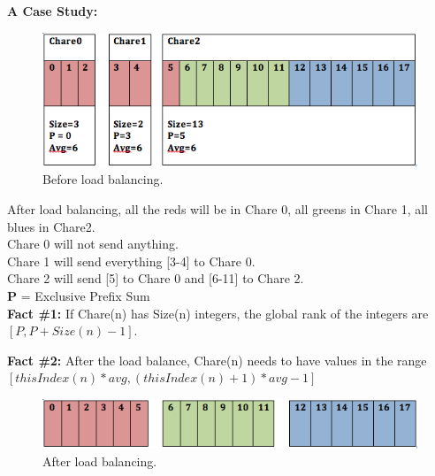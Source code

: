 \documentclass{article}
\begin{document}

\textbf{A Case Study:} 

\begin{figure}[h]
\centering
\includegraphics[width=\textwidth]{before_balance.png}
\caption{Before load balancing.}
\label{prefix}
\end{figure}

After load balancing, all the reds will be in Chare 0, all greens in Chare 1, all blues in Chare2. \\
Chare 0 will not send anything.\\
Chare 1 will send everything [3-4] to Chare 0.\\
Chare 2 will send [5] to Chare 0 and [6-11] to Chare 2.\\

\textbf{P} = Exclusive Prefix Sum \\

\textbf{Fact \#1:}
If Chare(n) has Size(n) integers, the global rank of the integers are $[P, P+Size(n)-1]$.

\textbf{Fact \#2:}
After the load balance, Chare(n) needs to have values in the range 
$[thisIndex(n)*avg, (thisIndex(n)+1)*avg-1]$\\

\begin{figure}[h]
\centering
\includegraphics[width=\textwidth]{after_balance.png}
\caption{After load balancing.}
\label{prefix}
\end{figure}
\end{document}
